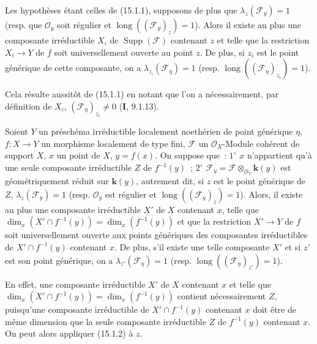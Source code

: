 \begin{corollary}[15.1.2]
\label{IV.15.1.2-fr}
Les hypothèses étant celles de (15.1.1), supposons de plus que
$\lambda_z(\mathcal F_y)=1$ (resp. que $\mathcal O_y$ soit régulier et
$\operatorname{long}((\mathcal F_y)_z)=1$). Alors il existe au plus une composante
irréductible $X_i$ de $\operatorname{Supp}(\mathcal F)$ contenant $z$ et telle que
la restriction $X_i\to Y$ de $f$ soit universellement ouverte au point $z$. De
plus, si $z_i$ est le point générique de cette composante, on a
$\lambda_{z_i}(\mathcal F_\eta)=1$ (resp.
$\operatorname{long}((\mathcal F_\eta)_{z_i})=1$).
\end{corollary}

Cela résulte aussitôt de (15.1.1) en notant que l'on a nécessairement, par
définition de $X_i$, $(\mathcal F_\eta)_{z_i}\ne0$ (\textbf{I}, 9.1.13).

\begin{corollary}[15.1.3]
\label{IV.15.1.3-fr}
Soient $Y$ un préschéma irréductible localement noethérien de point générique
$\eta$, $f:X\to Y$ un morphisme localement de type fini, $\mathcal F$ un
$\mathcal O_X$-Module cohérent de support $X$, $x$ un point de $X$, $y=f(x)$. On
suppose que~: $1^\circ$ $x$ n'appartient qu'à une seule composante irréductible
$Z$ de $f^{-1}(y)$~; $2^\circ$
$\mathcal F_y=\mathcal F\otimes_{\mathcal O_Y}\mathbf{k}(y)$ est géométriquement
réduit sur $\mathbf{k}(y)$, autrement dit, si $z$ est le point générique de $Z$,
$\lambda_z(\mathcal F_y)=1$ (resp. $\mathcal O_y$ est régulier et
$\operatorname{long}((\mathcal F_y)_z)=1$). Alors, il existe au plus une
composante irréductible $X'$ de $X$ contenant $x$, telle que
$\dim_x(X'\cap f^{-1}(y))=\dim_x(f^{-1}(y))$ et que la restriction $X'\to Y$ de
$f$ soit universellement ouverte aux points génériques des composantes
irréductibles de $X'\cap f^{-1}(y)$ contenant $x$. De plus, s'il existe une telle
composante $X'$ et si $z'$ est son point générique, on a
$\lambda_{z'}(\mathcal F_\eta)=1$ (resp.
$\operatorname{long}((\mathcal F_\eta)_{z'})=1$).
\end{corollary}

En effet, une composante irréductible $X'$ de $X$ contenant $x$ et telle que
$\dim_x(X'\cap f^{-1}(y))=\dim_x(f^{-1}(y))$ contient nécessairement $Z$,
puisqu'une composante irréductible de $X'\cap f^{-1}(y)$ contenant $x$ doit être
de même dimension que la seule composante irréductible $Z$ de $f^{-1}(y)$
contenant $x$. On peut alors appliquer (15.1.2) à $z$.

